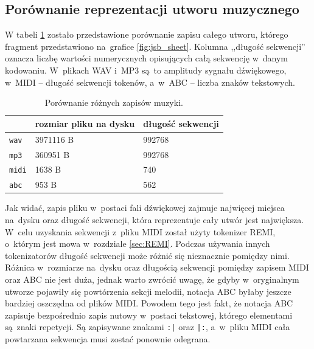 \documentclass[data-science]{agh-wi} %
\begin{document}
\subsection{Porównanie reprezentacji utworu muzycznego}
W tabeli \ref*{tab:music_diff} zostało przedstawione porównanie zapisu całego utworu, którego fragment przedstawiono na~grafice \ref*{fig:jsb_sheet}. Kolumna ,,długość sekwencji'' oznacza liczbę wartości numerycznych opisujących całą sekwencję w~danym kodowaniu. W~plikach WAV i~MP3 są~to amplitudy sygnału dźwiękowego, w~MIDI -- długość sekwencji tokenów, a~w~ABC -- liczba znaków tekstowych.

\begin{table}[ht!]
    \centering
    \begin{tabular}{|l|l|l|}
        \hline
                      & rozmiar pliku na dysku & długość sekwencji \\ \hline
        \texttt{wav}  & 3971116 B              & 992768            \\ \hline
        \texttt{mp3}  & 360951 B               & 992768            \\ \hline
        \texttt{midi} & 1638 B                 & 740               \\ \hline
        \texttt{abc}  & 953 B                  & 562               \\ \hline
    \end{tabular}
    \caption{Porównanie różnych zapisów muzyki.}\label{tab:music_diff}
\end{table}

Jak widać, zapis pliku w~postaci fali dźwiękowej zajmuje najwięcej miejsca na~dysku oraz długość sekwencji, która reprezentuje cały utwór jest największa. W~celu uzyskania sekwencji z~pliku MIDI został użyty tokenizer REMI, o~którym jest mowa w~rozdziale \ref*{sec:REMI}. Podczas używania innych tokenizatorów długość sekwencji może różnić się nieznacznie pomiędzy nimi. Różnica w~rozmiarze na~dysku oraz długością sekwencji pomiędzy zapisem MIDI oraz ABC nie jest duża, jednak warto zwrócić uwagę, że gdyby w~oryginalnym utworze pojawiły się powtórzenia sekcji melodii, notacja ABC byłaby jeszcze bardziej oszczędna od plików MIDI. Powodem tego jest fakt, że notacja ABC zapisuje bezpośrednio zapis nutowy w~postaci tekstowej, którego elementami są~znaki repetycji. Są zapisywane znakami \texttt{:|} oraz \texttt{|:}, a~w~pliku MIDI cała powtarzana sekwencja musi zostać ponownie odegrana.
\end{document}

